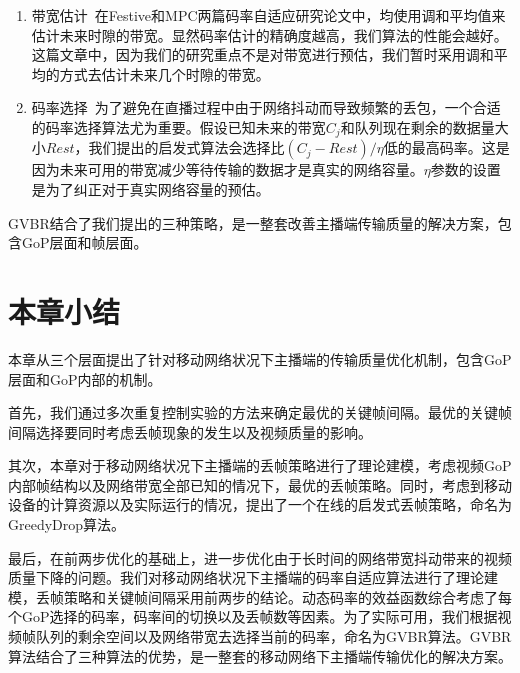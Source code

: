 \begin{enumerate}[1)]
  \item 带宽估计~在Festive和MPC两篇码率自适应研究论文中，均使用调和平均值来估计未来时隙的带宽。显然码率估计的精确度越高，我们算法的性能会越好。这篇文章中，因为我们的研究重点不是对带宽进行预估，我们暂时采用调和平均的方式去估计未来几个时隙的带宽。
  \item 码率选择~为了避免在直播过程中由于网络抖动而导致频繁的丢包，一个合适的码率选择算法尤为重要。假设已知未来的带宽$C_j$和队列现在剩余的数据量大小$Rest$，我们提出的启发式算法会选择比$(C_j-Rest)/\eta$低的最高码率。这是因为未来可用的带宽减少等待传输的数据才是真实的网络容量。$\eta$参数的设置是为了纠正对于真实网络容量的预估。
\end{enumerate}

GVBR结合了我们提出的三种策略，是一整套改善主播端传输质量的解决方案，包含GoP层面和帧层面。

\section{本章小结}
本章从三个层面提出了针对移动网络状况下主播端的传输质量优化机制，包含GoP层面和GoP内部的机制。

首先，我们通过多次重复控制实验的方法来确定最优的关键帧间隔。最优的关键帧间隔选择要同时考虑丢帧现象的发生以及视频质量的影响。

其次，本章对于移动网络状况下主播端的丢帧策略进行了理论建模，考虑视频GoP内部帧结构以及网络带宽全部已知的情况下，最优的丢帧策略。同时，考虑到移动设备的计算资源以及实际运行的情况，提出了一个在线的启发式丢帧策略，命名为GreedyDrop算法。

最后，在前两步优化的基础上，进一步优化由于长时间的网络带宽抖动带来的视频质量下降的问题。我们对移动网络状况下主播端的码率自适应算法进行了理论建模，丢帧策略和关键帧间隔采用前两步的结论。动态码率的效益函数综合考虑了每个GoP选择的码率，码率间的切换以及丢帧数等因素。为了实际可用，我们根据视频帧队列的剩余空间以及网络带宽去选择当前的码率，命名为GVBR算法。GVBR算法结合了三种算法的优势，是一整套的移动网络下主播端传输优化的解决方案。